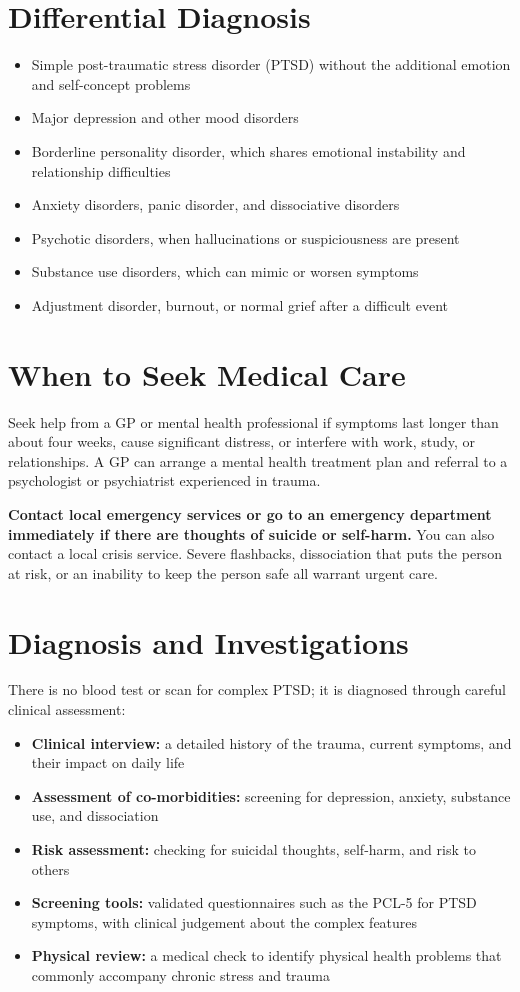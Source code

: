 \section*{Differential Diagnosis}
\begin{itemize}
    \item Simple post-traumatic stress disorder (PTSD) without the additional emotion and self-concept problems
    \item Major depression and other mood disorders
    \item Borderline personality disorder, which shares emotional instability and relationship difficulties
    \item Anxiety disorders, panic disorder, and dissociative disorders
    \item Psychotic disorders, when hallucinations or suspiciousness are present
    \item Substance use disorders, which can mimic or worsen symptoms
    \item Adjustment disorder, burnout, or normal grief after a difficult event
\end{itemize}

\section*{When to Seek Medical Care}
Seek help from a GP or mental health professional if symptoms last longer than about four weeks, cause significant distress, or interfere with work, study, or relationships. A GP can arrange a mental health treatment plan and referral to a psychologist or psychiatrist experienced in trauma.

\textbf{Contact local emergency services or go to an emergency department immediately if there are thoughts of suicide or self-harm.} You can also contact a local crisis service. Severe flashbacks, dissociation that puts the person at risk, or an inability to keep the person safe all warrant urgent care.

\section*{Diagnosis and Investigations}
There is no blood test or scan for complex PTSD; it is diagnosed through careful clinical assessment:

\begin{itemize}
    \item \textbf{Clinical interview:} a detailed history of the trauma, current symptoms, and their impact on daily life
    \item \textbf{Assessment of co-morbidities:} screening for depression, anxiety, substance use, and dissociation
    \item \textbf{Risk assessment:} checking for suicidal thoughts, self-harm, and risk to others
    \item \textbf{Screening tools:} validated questionnaires such as the PCL-5 for PTSD symptoms, with clinical judgement about the complex features
    \item \textbf{Physical review:} a medical check to identify physical health problems that commonly accompany chronic stress and trauma
\end{itemize}

